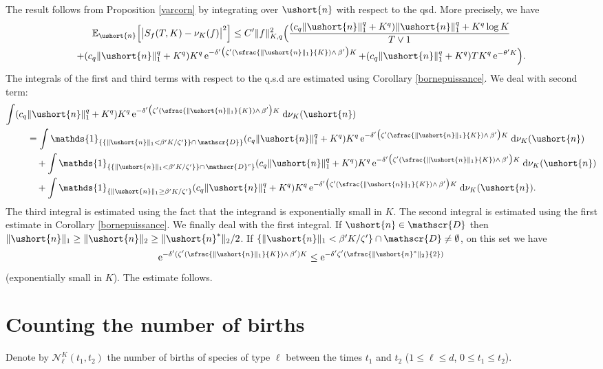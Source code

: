 \documentclass[JEP,XML,SOM,Unicode]{cedram}
\newcommand{\Psfrac}[2]{(\sfrac{#1}{#2})}
\newcommand{\scaleto}[2]{#1}
\let\mathcal\mathscr
\numberwithin{equation}{section}
\theoremstyle{plain}
\theoremstyle{definition}
\newcommand{\E}{{\mathbb{E}}}
\newcommand{\sK}{K}
\newcommand{\un}{\mathds{1}}
\newcommand{\vecn}{\ushort{n}}
\newcommand{\vecnf}{\ushort{n}^*}
\newcommand{\svecnf}{\ushort{n}^*}
\newcommand{\nuk}{\nu_{K}}\let\snuk\nuk
\newcommand{\e}{\operatorname{e}}
\newcommand{\dd}{\hspace{1pt}\mathrm{d}}
\newcommand{\norm}[1]{\|#1\|_{1}}\let\snorm\norm
\newcommand{\normdeux}[1]{\|#1\|_{2}}\let\snormdeux\normdeux
\begin{document}
The result follows from Proposition \ref{varcorn} by integrating over $\vecn$ with respect to the qsd.
More precisely, we have
\begin{multline*}
\E_{\vecn}\Bigl[\big|S_{f}(T,K)-\nuk(f)\big|^2\Bigr]\leq
C'\|f\|_{\sK,q}^2 \Bigl(\frac{(c_q\norm{\vecn}^{q} +K^q) \norm{\vecn}^{q} +K^q \log K}{T\vee 1}\\
+(c_q\norm{\vecn}^{q} +K^q) K^q \e^{-\delta'\bigl(\zeta' \Psfrac{\|\vecn\|_{1}}{K}\wedge\, \beta'\bigr)K}
+ (c_q\norm{\vecn}^{q} +K^q)T K^q \e^{-\theta'K}
\Bigr).
\end{multline*}
The integrals of the first and third terms with respect to the q.s.d are estimated using Corollary \ref{bornepuissance}.
We deal with second term:
\begin{align*}
\int (c_q&\norm{\vecn}^{q} +K^q) K^q \e^{-\delta'\bigl(\zeta' \Psfrac{\|\vecn\|_{1}}{K}\wedge\, \beta'\bigr)K} \dd\nuk(\vecn)\\
&
=\int \un_{\{\{\norm{\vecn} < \beta'K/\zeta'\}\}\cap\, \mathcal{D}\}} (c_q\norm{\vecn}^{q} +K^q) K^q
\e^{-\delta'\bigl(\zeta' \Psfrac{\|\vecn\|_{1}}{K}\wedge\, \beta'\bigr)K} \dd\nuk(\vecn)\\
& \quad+
\int \un_{\{\{\norm{\vecn} < \beta'K/\zeta'\}\}\cap\, \mathcal{D}^c\}} (c_q\norm{\vecn}^{q} +K^q) K^q
\e^{-\delta'\bigl(\zeta' \Psfrac{\|\vecn\|_{1}}{K}\wedge\, \beta'\bigr)K} \dd\nuk(\vecn)\\
& \quad+
\int \un_{\{\norm{\vecn} \geq \beta'K/\zeta'\}} (c_q\norm{\vecn}^{q} +K^q) K^q
\e^{-\delta'\bigl(\zeta' \Psfrac{\|\vecn\|_{1}}{K}\wedge\, \beta'\bigr)K} \dd\nuk(\vecn).
\end{align*}
The third integral is estimated using the fact that the integrand is exponentially small in $K$.
The second integral is estimated using the first estimate in Corollary \ref{bornepuissance}.
We finally deal with the first integral. If $\vecn\in \mathcal{D}$ then
$\norm{\vecn}\geq \normdeux{\vecn}\geq \normdeux{\vecnf}\scaleto{/2}{9pt}$.
If $\{\|\vecn\|_1 < \beta'K/\zeta'\}\cap \mathcal{D} \neq \emptyset$, on this set we have
\[
\e^{-\delta'(\zeta' \Psfrac{\|\vecn\|_{1}}{K}\wedge\, \beta')K}\leq \e^{-\delta'\zeta' \Psfrac{\|\svecnf\|_{\scaleto{2}{3pt}}}{2}}
\]
(exponentially small in $K$). The estimate follows.

\section{Counting the number of births}\label{nbsauts}

Denote by $\mathcal{N}^{\sK}_\ell(t_{1},t_{2})$ the number of births of species of type $\ell$ between the times $t_{1}$ and $t_{2}$ ($1\leq \ell \leq d$, $0\leq t_1\leq t_2$).
\end{document}
